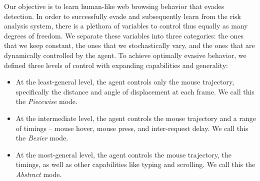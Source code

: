 
Our objective is to learn human-like web browsing behavior that evades detection.
In order to successfully evade and subsequently learn from the risk analysis system, there is a plethora of variables to control thus equally as many degrees of freedom.
We separate these variables into three categories: the ones that we keep constant, the ones that we stochastically vary, and the ones that are dynamically controlled by the agent.
To achieve optimally evasive behavior, we defined three levels of control with expanding capabilities and generality:

\begin{itemize}
  \item At the least-general level, the agent controls only the mouse trajectory, specifically the distance and angle of displacement at each frame. We call this the \emph{Piecewise} mode.
  \item At the intermediate level, the agent controls the mouse trajectory and a range of timings -- mouse hover, mouse press, and inter-request delay. We call this the \emph{Bezier} mode.
  \item At the most-general level, the agent controls the mouse trajectory, the timings, as well as other capabilities like typing and scrolling. We call this the \emph{Abstract} mode.
 \end{itemize}


